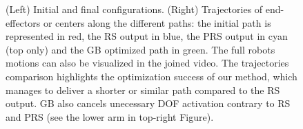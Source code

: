 \documentclass{tADR2e}
\begin{document}
\begin{figure}
{		\label{fig:trajectories:puzzle}
	}
  \caption{(Left) Initial and final configurations.
  (Right) Trajectories of end-effectors or centers along the 
  different paths: the initial path is represented in red, the RS 
  output in blue, the PRS output in cyan (top only) and the GB optimized path 
  in green. The full robots 
  motions can also be visualized in the joined video. The 
  trajectories comparison highlights the optimization success of our method, 
  which manages to deliver a shorter or similar path compared to the RS output. 
  GB also cancels unecessary DOF activation contrary to RS and PRS (see the 
  lower arm in top-right Figure).}
  \label{fig:trajectories}
\end{figure}
\end{document}

